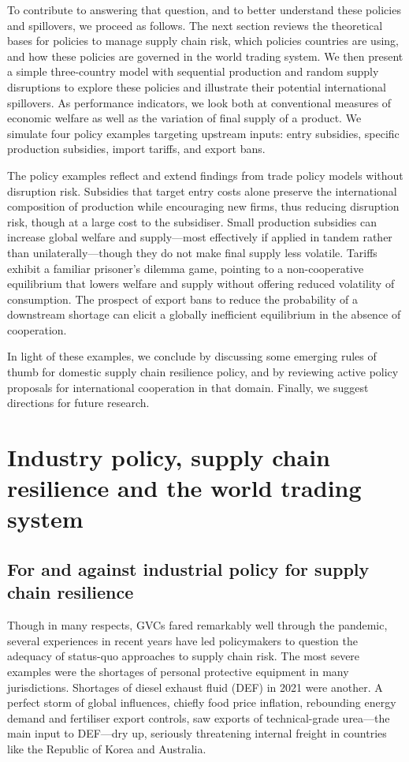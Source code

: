\documentclass{article}
\begin{document}
To contribute to answering that question, and to better understand these policies and spillovers, we proceed as follows. The next section reviews the theoretical bases for policies to manage supply chain risk, which policies countries are using, and how these policies are governed in the world trading system. We then present a simple three-country model with sequential production and random supply disruptions to explore these policies and illustrate their potential international spillovers. As performance indicators, we look both at conventional measures of economic welfare as well as the variation of final supply of a product. We simulate four policy examples targeting upstream inputs: entry subsidies, specific production subsidies, import tariffs, and export bans.

The policy examples reflect and extend findings from trade policy models without disruption risk. Subsidies that target entry costs alone preserve the international composition of production while encouraging new firms, thus reducing disruption risk, though at a large cost to the subsidiser. Small production subsidies can increase global welfare and supply---most effectively if applied in tandem rather than unilaterally---though they do not make final supply less volatile. Tariffs exhibit a familiar prisoner's dilemma game, pointing to a non-cooperative equilibrium that lowers welfare and supply without offering reduced volatility of consumption. The prospect of export bans to reduce the probability of a downstream shortage can elicit a globally inefficient equilibrium in the absence of cooperation.

In light of these examples, we conclude by discussing some emerging rules of thumb for domestic supply chain resilience policy, and by reviewing active policy proposals for international cooperation in that domain. Finally, we suggest directions for future research.

\section{Industry policy, supply chain resilience and the world trading system}

\subsection{For and against industrial policy for supply chain resilience}

Though in many respects, GVCs fared remarkably well through the pandemic, several experiences in recent years have led policymakers to question the adequacy of status-quo approaches to supply chain risk. The most severe examples were the shortages of personal protective equipment in many jurisdictions. Shortages of diesel exhaust fluid (DEF) in 2021 were another. A perfect storm of global influences, chiefly food price inflation, rebounding energy demand and fertiliser export controls, saw exports of technical-grade urea---the main input to DEF---dry up, seriously threatening internal freight in countries like the Republic of Korea and Australia. 
\end{document}
